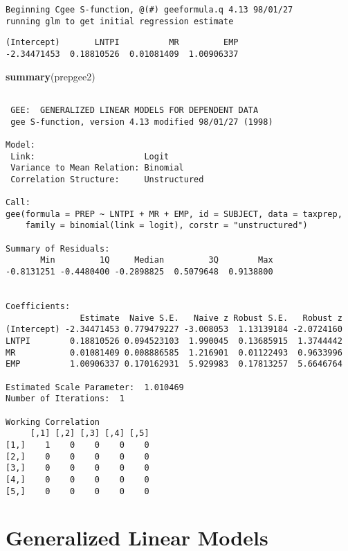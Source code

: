 \documentclass[]{book}
\newenvironment{Shaded}{\begin{snugshade}}{\end{snugshade}}
\newcommand{\KeywordTok}[1]{\textcolor[rgb]{0.13,0.29,0.53}{\textbf{#1}}}
\newcommand{\NormalTok}[1]{#1}
\begin{document}
\begin{verbatim}
Beginning Cgee S-function, @(#) geeformula.q 4.13 98/01/27
running glm to get initial regression estimate
\end{verbatim}

\begin{verbatim}
(Intercept)       LNTPI          MR         EMP 
-2.34471453  0.18810526  0.01081409  1.00906337 
\end{verbatim}

\begin{Shaded}
\begin{Highlighting}[]
\KeywordTok{summary}\NormalTok{(prepgee2)}
\end{Highlighting}
\end{Shaded}

\begin{verbatim}

 GEE:  GENERALIZED LINEAR MODELS FOR DEPENDENT DATA
 gee S-function, version 4.13 modified 98/01/27 (1998) 

Model:
 Link:                      Logit 
 Variance to Mean Relation: Binomial 
 Correlation Structure:     Unstructured 

Call:
gee(formula = PREP ~ LNTPI + MR + EMP, id = SUBJECT, data = taxprep, 
    family = binomial(link = logit), corstr = "unstructured")

Summary of Residuals:
       Min         1Q     Median         3Q        Max 
-0.8131251 -0.4480400 -0.2898825  0.5079648  0.9138800 


Coefficients:
               Estimate  Naive S.E.   Naive z Robust S.E.   Robust z
(Intercept) -2.34471453 0.779479227 -3.008053  1.13139184 -2.0724160
LNTPI        0.18810526 0.094523103  1.990045  0.13685915  1.3744442
MR           0.01081409 0.008886585  1.216901  0.01122493  0.9633996
EMP          1.00906337 0.170162931  5.929983  0.17813257  5.6646764

Estimated Scale Parameter:  1.010469
Number of Iterations:  1

Working Correlation
     [,1] [,2] [,3] [,4] [,5]
[1,]    1    0    0    0    0
[2,]    0    0    0    0    0
[3,]    0    0    0    0    0
[4,]    0    0    0    0    0
[5,]    0    0    0    0    0
\end{verbatim}

\hypertarget{generalized-linear-models}{%
\chapter{Generalized Linear Models}\label{generalized-linear-models}}
\end{document}
